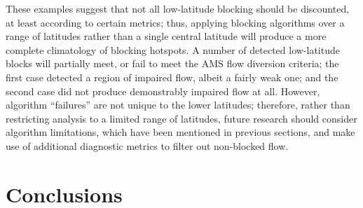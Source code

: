 \documentclass[smallextended]{svjour3}       %
\numberwithin{equation}{section}
\begin{document}
These examples suggest that not all low-latitude blocking should be discounted, at least according to certain metrics; thus, applying blocking algorithms over a range of latitudes rather than a single central latitude will produce a more complete climatology of blocking hotspots. A number of detected low-latitude blocks will partially meet, or fail to meet the AMS flow diversion criteria; the first case detected a region of impaired flow, albeit a fairly weak one; and the second case did not produce demonstrably impaired flow at all. However, algorithm ``failures'' are not unique to the lower latitudes; therefore, rather than restricting analysis to a limited range of latitudes, future research should consider algorithm limitations, which have been mentioned in previous sections, and make use of additional diagnostic metrics to filter out non-blocked flow. 

\section{Conclusions}\label{concsec}
\end{document}
